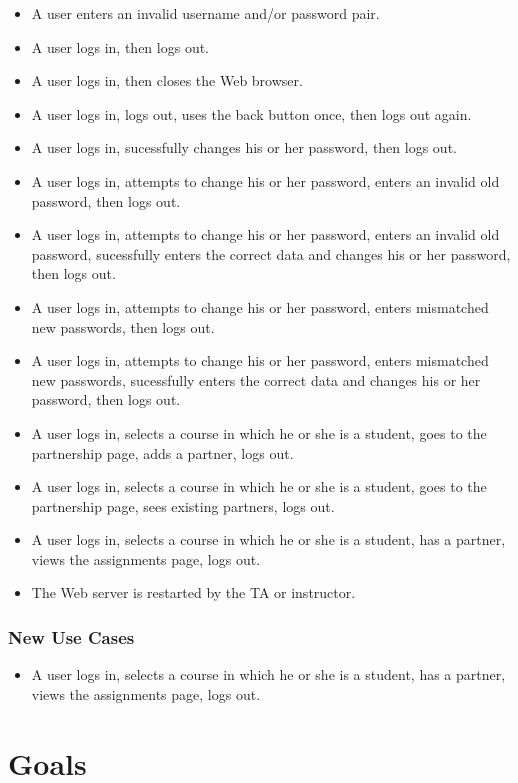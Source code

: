 \documentclass[a4paper]{article}
\begin{document}
\begin{itemize}
\item{A user enters an invalid username and/or password pair.}
\item{A user logs in, then logs out.}
\item{A user logs in, then closes the Web browser.}
\item{A user logs in, logs out, uses the back button once, then logs out again.}
\item{A user logs in, sucessfully changes his or her password, then logs out.}
\item{A user logs in, attempts to change his or her password, enters an invalid
old password, then logs out.}
\item{A user logs in, attempts to change his or her password, enters an invalid
old password, sucessfully enters the correct data and changes his or her password,
then logs out.}
\item{A user logs in, attempts to change his or her password, enters mismatched
new passwords, then logs out.}
\item{A user logs in, attempts to change his or her password, enters mismatched
new passwords, sucessfully enters the correct data and changes his or her password,
then logs out.}
\item{A user logs in, selects a course in which he or she is a student, goes to
  the partnership page, adds a partner, logs out.}
\item{A user logs in, selects a course in which he or she is a student, goes to
  the partnership page, sees existing partners, logs out.}
\item{A user logs in, selects a course in which he or she is a student, has a
  partner, views the assignments page, logs out.}
\item{The Web server is restarted by the TA or instructor.}
\end{itemize}

\subsubsection{New Use Cases}\label{subsubsec:newusecases}
\begin{itemize}
\item{A user logs in, selects a course in which he or she is a student, has a
  partner, views the assignments page, logs out.}
\end{itemize}

\section{Goals}\label{sec:goals}
\end{document}
